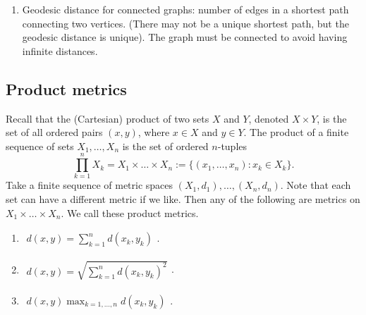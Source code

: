 \documentclass[12pt]{amsart}         %
\theoremstyle{remark}
\begin{document}
\begin{enumerate}
\item Geodesic distance for connected graphs: number of edges in a shortest path connecting two vertices. (There may not be a unique shortest path, but the geodesic distance is unique). The graph must be connected to avoid having infinite distances.

\end{enumerate}

\subsection{Product metrics}

Recall that the (Cartesian) product of two sets $X$ and $Y$, denoted $X \times Y$, is the set of all ordered pairs $(x,y)$, where $x \in X$ and $y \in Y$. The product of a finite sequence of sets $X_1, \dots, X_n$ is the set of ordered $n$-tuples
\[
\prod_{k=1}^n X_k = X_1 \times \dots \times X_n := \{ (x_1, \dots, x_n)  : x_k \in X_k \}.
\]
Take a finite sequence of metric spaces $(X_1, d_1), \dots, (X_n, d_n)$. Note that each set can have a different metric if we like. Then any of the following are metrics on $X_1 \times \dots \times X_n$. We call these product metrics.
\begin{enumerate}
    \item $\begin{aligned}d(x, y) = \sum_{k=1}^n d(x_k, y_k) \end{aligned}$.
    \item $\begin{aligned}d(x, y) = \sqrt{ \sum_{k=1}^n d(x_k, y_k)^2  } \end{aligned}$.
    \item $\begin{aligned}d(x,y) \max_{k = 1, \dots, n} d(x_k, y_k) \end{aligned}$.
\end{enumerate}
\end{document}
